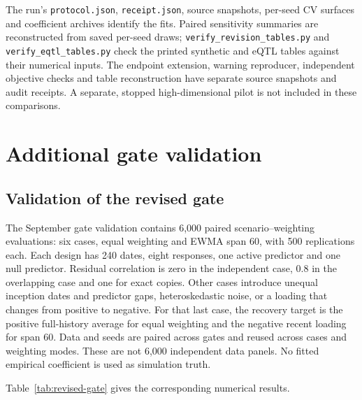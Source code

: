 \documentclass[11pt,a4paper]{article}
\begin{document}
The run's \texttt{protocol.json}, \texttt{receipt.json}, source snapshots, per-seed
CV surfaces and coefficient archives identify the fits. Paired sensitivity
summaries are reconstructed from saved per-seed draws;
\nolinkurl{verify_revision_tables.py} and \nolinkurl{verify_eqtl_tables.py}
check the printed synthetic and eQTL tables against their numerical inputs.
The endpoint extension, warning reproducer, independent objective checks and
table reconstruction have separate source snapshots and audit receipts.
A separate, stopped high-dimensional pilot is not included in these comparisons.

\FloatBarrier

\section{Additional gate validation}\label{app:gate-validation}

\subsection{Validation of the revised gate}\label{sec:revised-validation}

The September gate validation contains 6,000 paired scenario--weighting evaluations: six cases, equal weighting and EWMA span
60, with 500 replications each. Each design has 240 dates, eight responses, one
active predictor and one null predictor. Residual correlation is zero in the
independent case, 0.8 in the overlapping case and one for exact copies. Other
cases introduce unequal inception dates and predictor gaps, heteroskedastic
noise, or a loading that changes from positive to negative. For that last case,
the recovery target is the positive full-history average for equal weighting
and the negative recent loading for span 60. Data and seeds are paired across
gates and reused across cases and weighting modes. These are not 6,000 independent data panels. No fitted empirical coefficient is used as simulation truth.

\noindent Table~\ref{tab:revised-gate} gives the corresponding numerical results.
\end{document}
